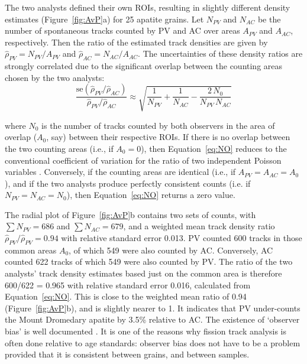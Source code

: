 \documentclass[gchron, manuscript]{copernicus}
\begin{document}
The two analysts defined their own ROIs, resulting in slightly
different density estimates (Figure~\ref{fig:AvP}a) for 25 apatite
grains.  Let $N_{PV}$ and $N_{AC}$ be the number of spontaneous tracks
counted by PV and AC over areas $A_{PV}$ and $A_{AC}$,
respectively. Then the ratio of the estimated track densities are
given by $\hat{\rho}_{PV} = N_{PV}/A_{PV}$ and $\hat{\rho}_{AC} =
N_{AC}/A_{AC}$. The uncertainties of these density ratios are strongly
correlated due to the significant overlap between the counting areas
chosen by the two analysts:
\begin{equation}
  \frac{\mbox{se}(\hat{\rho}_{PV}/\hat{\rho}_{AC})}{\hat{\rho}_{PV}/\hat{\rho}_{AC}}
  \approx
  \sqrt{
    \frac{1}{N_{PV}} + \frac{1}{N_{AC}} - \frac{2\,N_{0}}{N_{PV}\,N_{AC}}
  }
  \label{eq:NO}
\end{equation}

\noindent where $N_{0}$ is the number of tracks counted by both
observers in the area of overlap ($A_0$, say) between their respective
ROIs.  If there is no overlap between the two counting areas (i.e., if
$A_0=0$), then Equation~\ref{eq:NO} reduces to the conventional
coefficient of variation for the ratio of two independent Poisson
variables \citep{galbraith1990a}.  Conversely, if the counting areas
are identical (i.e., if $A_{PV}=A_{AC}=A_0$), and if the two analysts
produce perfectly consistent counts (i.e. if $N_{PV} = N_{AC} =
N_{0}$), then Equation~\ref{eq:NO} returns a zero value.\medskip

The radial plot of Figure~\ref{fig:AvP}b contains two sets of counts,
with $\sum N_{PV} = 686$ and $\sum N_{AC} = 679$, and a weighted mean
track density ratio $\hat{\rho}_{PV}/\hat{\rho}_{PV} = 0.94$ with
relative standard error 0.013. PV counted 600 tracks in those common
areas $A_0$, of which 549 were also counted by AC. Conversely, AC
counted 622 tracks of which 549 were also counted by PV. The ratio of
the two analysts' track density estimates based just on the common
area is therefore 600/622 = 0.965 with relative standard error 0.016,
calculated from Equation~\ref{eq:NO}. This is close to the weighted
mean ratio of 0.94 (Figure~\ref{fig:AvP}b), and is slightly nearer to
1. It indicates that PV under-counts the Mount Dromedary apatite by
3.5\% relative to AC.  The existence of `observer bias' is well
documented \citep{tamer2025}.  It is one of the reasons why fission
track analysis is often done relative to age standards: observer bias
does not have to be a problem provided that it is consistent between
grains, and between samples.\medskip
\end{document}
